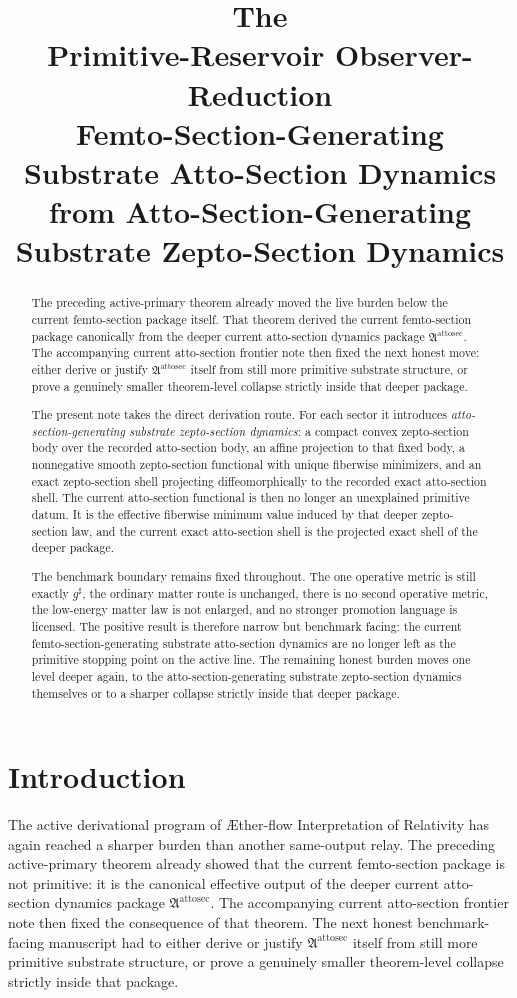 \documentclass[11pt]{article}
\title{\textbf{The \TheoryName{}}\\[0.4em]
\large Primitive-Reservoir Observer-Reduction\\
\large Femto-Section-Generating Substrate Atto-Section Dynamics\\
\large from Atto-Section-Generating Substrate Zepto-Section Dynamics}
\author{}
\date{}
\newcommand{\Aflow}{\AE{}ther-flow}
\newcommand{\TheoryName}{\Aflow{} Interpretation of Relativity}
\newcommand{\CompletedMetric}{g^{\sharp}}
\newcommand{\AttoSectionPackage}{\mathfrak A^{\mathrm{attosec}}}
\begin{document}
\maketitle

\begin{abstract}
The preceding active-primary theorem already moved the live burden below the current femto-section package itself. That theorem derived the current femto-section package canonically from the deeper current atto-section dynamics package \(\AttoSectionPackage\). The accompanying current atto-section frontier note then fixed the next honest move: either derive or justify \(\AttoSectionPackage\) itself from still more primitive substrate structure, or prove a genuinely smaller theorem-level collapse strictly inside that deeper package.

The present note takes the direct derivation route. For each sector it introduces \emph{atto-section-generating substrate zepto-section dynamics}: a compact convex zepto-section body over the recorded atto-section body, an affine projection to that fixed body, a nonnegative smooth zepto-section functional with unique fiberwise minimizers, and an exact zepto-section shell projecting diffeomorphically to the recorded exact atto-section shell. The current atto-section functional is then no longer an unexplained primitive datum. It is the effective fiberwise minimum value induced by that deeper zepto-section law, and the current exact atto-section shell is the projected exact shell of the deeper package.

The benchmark boundary remains fixed throughout. The one operative metric is still exactly \(\CompletedMetric\), the ordinary matter route is unchanged, there is no second operative metric, the low-energy matter law is not enlarged, and no stronger promotion language is licensed. The positive result is therefore narrow but benchmark facing: the current femto-section-generating substrate atto-section dynamics are no longer left as the primitive stopping point on the active line. The remaining honest burden moves one level deeper again, to the atto-section-generating substrate zepto-section dynamics themselves or to a sharper collapse strictly inside that deeper package.
\end{abstract}

\section{Introduction}

The active derivational program of \TheoryName{} has again reached a sharper burden than another same-output relay. The preceding active-primary theorem already showed that the current femto-section package is not primitive: it is the canonical effective output of the deeper current atto-section dynamics package \(\AttoSectionPackage\). The accompanying current atto-section frontier note then fixed the consequence of that theorem. The next honest benchmark-facing manuscript had to either derive or justify \(\AttoSectionPackage\) itself from still more primitive substrate structure, or prove a genuinely smaller theorem-level collapse strictly inside that package.
\end{document}
